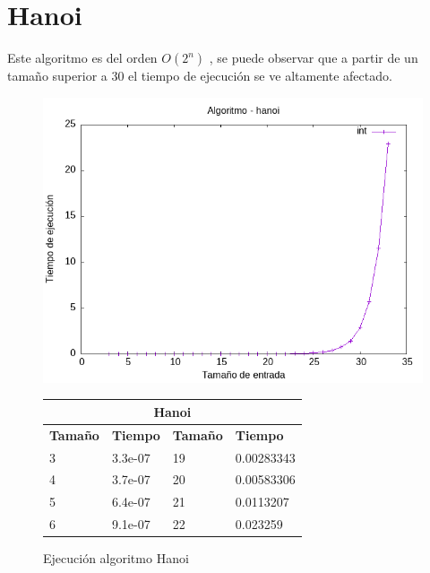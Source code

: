 \documentclass[11pt,openany]{book}
\begin{document}
\section*{Hanoi}
Este algoritmo es del orden $O(2^n)$ , se puede observar que a partir de un tamaño superior a 30 el tiempo de ejecución se ve
altamente afectado.
\begin{figure}[H]
    \begin{minipage}{0.5\textwidth}
        \centering
        \includegraphics[width=\linewidth]{assets/Img/hanoiint.png}
        \caption{Ejecución algoritmo Hanoi}
        \label{fig:hanoi}
    \end{minipage}%
    \begin{minipage}{0.5\textwidth}
        \centering
        \small
        \begin{tabular}{|l|l|l|l|}
            \hline
            \multicolumn{4}{|c|}{\cellcolor{blue!20}\textbf{Hanoi}}               \\ \hline
            \textbf{Tamaño} & \textbf{Tiempo} & \textbf{Tamaño} & \textbf{Tiempo} \\ \hline
            3               & 3.3e-07         & 19              & 0.00283343      \\ \hline
            4               & 3.7e-07         & 20              & 0.00583306      \\ \hline
            5               & 6.4e-07         & 21              & 0.0113207       \\ \hline
            6               & 9.1e-07         & 22              & 0.023259        \\ \hline

\end{tabular}
\end{minipage}
\end{figure}
\end{document}
